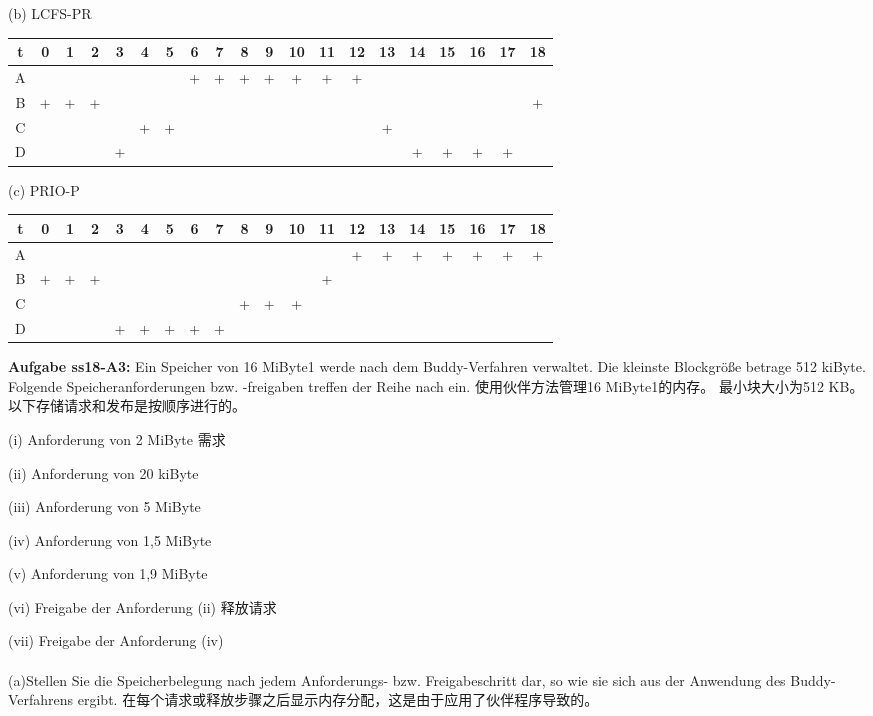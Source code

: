 \documentclass[fleqn]{article}
\begin{document}
(b) LCFS-PR

\begin{center}
    \begin{tabular}{|c||c|c|c|c|c|c|c|c|c|c|c|c|c|c|c|c|c|c|c|}
        \hline
        t&0&1&2&3&4&5&6&7&8&9&10&11&12&13&14&15&16&17&18\\
        \hline
        A&&&&&&&+&+&+&+&+&+&+&&&&&&\\
        \hline
        B&+&+&+&&&&&&&&&&&&&&&&+\\
        \hline
        C&&&&&+&+&&&&&&&&+&&&&&\\
        \hline
        D&&&&+&&&&&&&&&&&+&+&+&+&\\
        \hline
    \end{tabular}
\end{center}

(c) PRIO-P

\begin{center}
    \begin{tabular}{|c||c|c|c|c|c|c|c|c|c|c|c|c|c|c|c|c|c|c|c|}
        \hline
        t&0&1&2&3&4&5&6&7&8&9&10&11&12&13&14&15&16&17&18\\
        \hline
        A&&&&&&&&&&&&&+&+&+&+&+&+&+\\
        \hline
        B&+&+&+&&&&&&&&&+&&&&&&&\\
        \hline
        C&&&&&&&&&+&+&+&&&&&&&&\\
        \hline
        D&&&&+&+&+&+&+&&&&&&&&&&&\\
        \hline
    \end{tabular}
\end{center}


\noindent\textbf{Aufgabe ss18-A3:} Ein Speicher von 16 MiByte1 werde nach dem Buddy-Verfahren verwaltet. Die kleinste Blockgröße betrage 512 kiByte. Folgende Speicheranforderungen bzw. -freigaben treffen der Reihe nach ein.
使用伙伴方法管理16 MiByte1的内存。 最小块大小为512 KB。 以下存储请求和发布是按顺序进行的。

(i) Anforderung von 2 MiByte 需求

(ii) Anforderung von 20 kiByte 

(iii) Anforderung von 5 MiByte 

(iv) Anforderung von 1,5 MiByte 

(v) Anforderung von 1,9 MiByte 

(vi) Freigabe der Anforderung (ii)  释放请求

(vii) Freigabe der Anforderung (iv)
\\
\\
\indent (a)Stellen Sie die Speicherbelegung nach jedem Anforderungs- bzw. Freigabeschritt dar, so wie sie sich aus der Anwendung des Buddy-Verfahrens ergibt.
在每个请求或释放步骤之后显示内存分配，这是由于应用了伙伴程序导致的。
\end{document}

